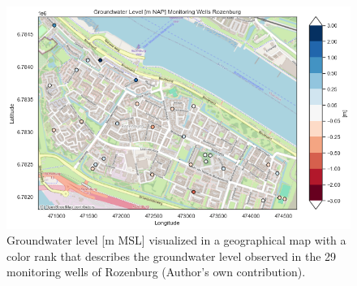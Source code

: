 \begin{figure}[htbp]
    \centering
    \includegraphics[width=0.80\linewidth]{gwlroz.png}
    \caption{Groundwater level [m MSL] visualized in a geographical map with a color rank that describes the groundwater level observed in the 29 monitoring wells of Rozenburg (Author's own contribution).}
    \label{fig:enter-label}
\end{figure}

